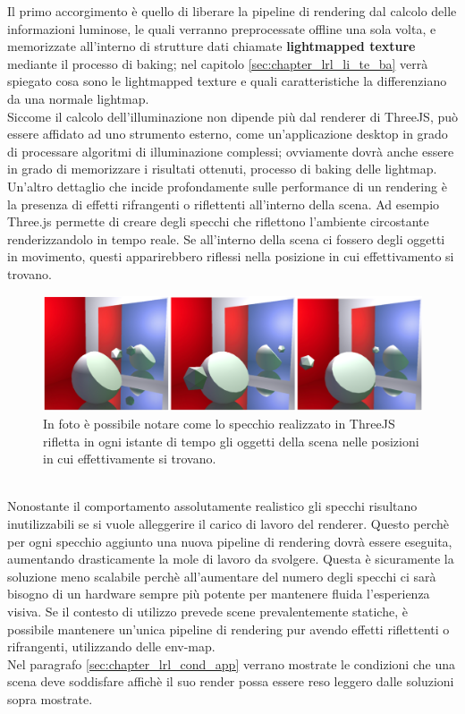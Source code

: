Il primo accorgimento è quello di liberare la pipeline di rendering dal calcolo delle informazioni luminose, le quali verranno preprocessate offline una sola volta, e memorizzate all’interno di strutture dati chiamate \textbf{lightmapped texture} mediante il processo di baking; nel capitolo \ref{sec:chapter_lrl_li_te_ba} verrà spiegato cosa sono le lightmapped texture e quali caratteristiche la differenziano da una normale lightmap. 
\\
Siccome il calcolo dell’illuminazione non dipende più dal renderer di ThreeJS, può essere affidato ad uno strumento esterno, come un’applicazione desktop in grado di processare algoritmi di illuminazione complessi; ovviamente dovrà anche essere in grado di memorizzare i risultati ottenuti, processo di baking delle lightmap.
Un’altro dettaglio che incide profondamente sulle performance di un rendering è la presenza di effetti rifrangenti o riflettenti all’interno della scena. Ad esempio Three.js permette di creare degli specchi che riflettono l’ambiente circostante renderizzandolo in tempo reale.
Se all’interno della scena ci fossero degli oggetti in movimento, questi apparirebbero riflessi nella posizione in cui effettivamento si trovano.
\\
\begin{figure}[htb]
 \centering
 \includegraphics[width=0.9\linewidth]{images/chapter_lrl/lrl_specchio.png}\hfill
 \caption[ThreeJS Mirror]{In foto è possibile notare come lo specchio realizzato in ThreeJS rifletta in ogni istante di tempo gli oggetti della scena nelle posizioni in cui effettivamente si trovano.}
 \label{fig:lrl_specchio}
\end{figure}
\\
Nonostante il comportamento assolutamente realistico gli specchi risultano inutilizzabili se si vuole  alleggerire il carico di lavoro del renderer. Questo perchè per ogni specchio aggiunto una nuova pipeline di rendering dovrà essere eseguita, aumentando drasticamente la mole di lavoro da svolgere. Questa è sicuramente la soluzione meno scalabile perchè all’aumentare del numero degli specchi ci sarà bisogno di un hardware sempre più potente per mantenere fluida l’esperienza visiva. Se il contesto di utilizzo prevede scene prevalentemente statiche, è possibile  mantenere un’unica pipeline di rendering pur avendo effetti riflettenti o rifrangenti, utilizzando delle env-map. 
\\
Nel paragrafo \ref{sec:chapter_lrl_cond_app} verrano mostrate le condizioni che una scena deve soddisfare affichè il suo render possa essere reso leggero dalle soluzioni sopra mostrate.
